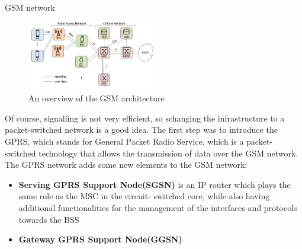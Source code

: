 \begin{section}{GSM network}
  \begin{figure}[h]
    \centering
    \includegraphics[width=0.5\textwidth]{img/wireless/gsm network.png}
    \caption{An overview of the GSM architecture}
    \label{fig:gsm-architecture}
  \end{figure}
  Of course, signalling is not very efficient, so schanging the infrastructure to a packet-switched
  network is a good idea. The first step was to introduce the GPRS, which stands for General Packet
  Radio Service, which is a packet-switched technology that allows the transmission of data over the
  GSM network. The GPRS network adds some new elements to the GSM network:
  \begin{itemize}
    \item \textbf{Serving GPRS Support Node(SGSN)} is an IP router which plays the same role as the
      MSC in the circuit- switched core, while also having additional functionalities for the
      management of the interfaces and protocols towards the BSS
    \item \textbf{Gateway GPRS Support Node(GGSN)}
  \end{itemize}
\end{section}

